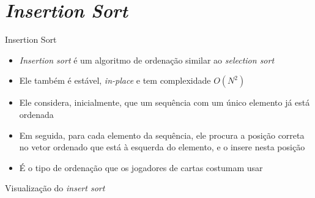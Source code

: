 \section{\itshape Insertion Sort}

\begin{frame}[fragile]{Insertion Sort}

    \begin{itemize}
        \item \textit{Insertion sort} é um algoritmo de ordenação similar ao \textit{selection
            sort}

        \item Ele também é estável, \textit{in-place} e tem complexidade $O(N^2)$

        \item Ele considera, inicialmente, que um sequência com um único elemento já 
            está ordenada

        \item Em seguida, para cada elemento da sequência, ele procura a posição correta
            no vetor ordenado que está à esquerda do elemento, e o insere nesta posição

        \item É o tipo de ordenação que os jogadores de cartas costumam usar
        
    \end{itemize}

\end{frame}

\begin{frame}[fragile]{Visualização do \textit{insert sort}}


\end{frame}

